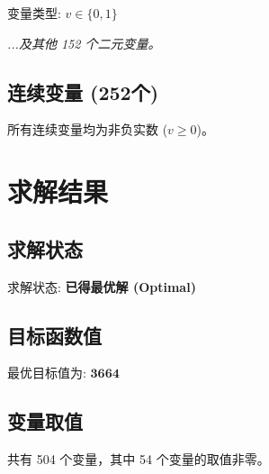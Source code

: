 \documentclass[a4paper,10pt]{article}
\begin{document}
变量类型: $v \in \{0,1\}$

\textit{...及其他 152 个二元变量。}

\subsection{连续变量 (252个)}

所有连续变量均为非负实数 ($v \geq 0$)。

\section{求解结果}

\subsection{求解状态}

求解状态: \textbf{已得最优解 (Optimal)}

\subsection{目标函数值}

最优目标值为: $\mathbf{3664}$

\subsection{变量取值}

共有 504 个变量，其中 54 个变量的取值非零。
\end{document}
